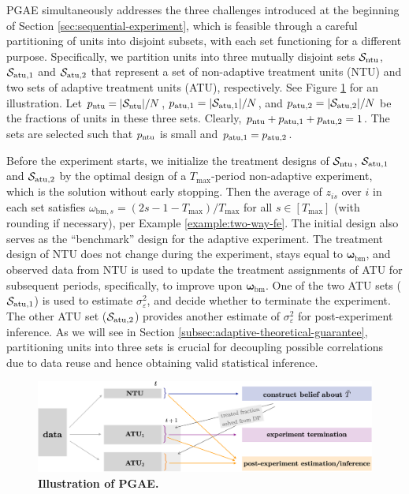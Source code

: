 PGAE simultaneously addresses the three challenges introduced at the beginning of Section \ref{sec:sequential-experiment}, which is feasible through a careful partitioning of units into disjoint subsets, with each set functioning for a different purpose.
Specifically, we partition units into three mutually disjoint sets $\mathcal{S}_{\mathrm{ntu}}$, $\mathcal{S}_{\mathrm{atu},1}$ and $\mathcal{S}_{\mathrm{atu},2}$ that represent a set of non-adaptive treatment units (NTU) and two sets of adaptive treatment units (ATU), respectively. See Figure \ref{fig:pgae} for an illustration.
Let $p_{\mathrm{ntu}} = |\mathcal{S}_{\mathrm{ntu}}|/N$, $p_{\mathrm{atu},1} = |\mathcal{S}_{\mathrm{atu},1}|/N$, and $p_{\mathrm{atu},2} = |\mathcal{S}_{\mathrm{atu},2}|/N$ be the fractions of units in these three sets. Clearly, $p_{\mathrm{ntu}} + p_{\mathrm{atu},1} + p_{\mathrm{atu},2} = 1$. The sets are selected such that $p_{\mathrm{ntu}}$ is small and $p_{\mathrm{atu},1} = p_{\mathrm{atu},2}$. 

Before the experiment starts, we initialize the treatment designs of $\mathcal{S}_{\mathrm{ntu}}$, $\mathcal{S}_{\mathrm{atu},1}$ and $\mathcal{S}_{\mathrm{atu},2}$ by the optimal design of a $T_{\max}$-period non-adaptive experiment, which is the solution without early stopping. Then the average of $z_{is}$ over $i$ in each set satisfies $\omega_{\mathrm{bm},s} = (2s - 1 - T_{\max})/{T_{\max}}$ for all $s\in[T_{\max}]$ (with rounding if necessary), per Example \ref{example:two-way-fe}. The initial design also serves as the ``benchmark'' design for the adaptive experiment.
%
 The treatment design of NTU does not change during the experiment, stays equal to $\bm{\omega}_{\mathrm{bm}}$, and observed data from
NTU is used to update the treatment assignments of ATU for subsequent periods, specifically, to improve upon $\bm{\omega}_{\mathrm{bm}}$. One of the two ATU sets ($\mathcal{S}_{\mathrm{atu},1}$) is used to estimate $\sigma_\varepsilon^2$, and decide whether to terminate the experiment. The other ATU set ($\mathcal{S}_{\mathrm{atu},2}$) provides another estimate of $\sigma_\varepsilon^2$ for post-experiment inference. As we will see in Section \ref{subsec:adaptive-theoretical-guarantee}, partitioning units into three sets is crucial for decoupling possible correlations due to data reuse and hence obtaining valid statistical inference.

    \begin{figure}[t!]
		\centering
		\includegraphics[width=0.8\linewidth]{plots/illustration/pgae.png}
		\caption{\textbf{Illustration of PGAE.}}
		\label{fig:pgae}
	\end{figure}
	
